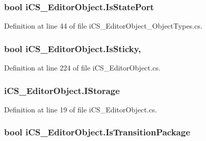 \hypertarget{classi_c_s___editor_object_a792ad0382f70b178adaa3cbc4b5b0553}{
\subsubsection[{Is\+State\+Port}]{\setlength{\rightskip}{0pt plus 5cm}bool i\+C\+S\+\_\+\+Editor\+Object.\+Is\+State\+Port\hspace{0.3cm}{\ttfamily [get]}}}\label{classi_c_s___editor_object_a792ad0382f70b178adaa3cbc4b5b0553}


Definition at line 44 of file i\+C\+S\+\_\+\+Editor\+Object\+\_\+\+Object\+Types.\+cs.

\hypertarget{classi_c_s___editor_object_a94884655fd1d9756256ea94dcb4cf411}{
\subsubsection[{Is\+Sticky}]{\setlength{\rightskip}{0pt plus 5cm}bool i\+C\+S\+\_\+\+Editor\+Object.\+Is\+Sticky\hspace{0.3cm}{\ttfamily [get]}, {\ttfamily [set]}}}\label{classi_c_s___editor_object_a94884655fd1d9756256ea94dcb4cf411}


Definition at line 224 of file i\+C\+S\+\_\+\+Editor\+Object.\+cs.

\hypertarget{classi_c_s___editor_object_a359db7e39433aadcd0e71c345777be47}{
\subsubsection[{I\+Storage}]{ i\+C\+S\+\_\+\+Editor\+Object.\+I\+Storage\hspace{0.3cm}{\ttfamily [get]}}}\label{classi_c_s___editor_object_a359db7e39433aadcd0e71c345777be47}


Definition at line 19 of file i\+C\+S\+\_\+\+Editor\+Object.\+cs.

\hypertarget{classi_c_s___editor_object_ad80838fc0308dc8fdc6887f04726fccf}{
\subsubsection[{Is\+Transition\+Package}]{\setlength{\rightskip}{0pt plus 5cm}bool i\+C\+S\+\_\+\+Editor\+Object.\+Is\+Transition\+Package\hspace{0.3cm}{\ttfamily [get]}}}\label{classi_c_s___editor_object_ad80838fc0308dc8fdc6887f04726fccf}



